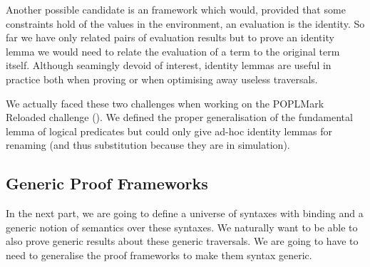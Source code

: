 Another possible candidate is an  framework which would, provided that some
constraints hold of the values in the environment, an evaluation is the identity. So far
we have only related pairs of evaluation results but to prove an identity lemma we would
need to relate the evaluation of a term to the original term itself. Although seamingly
devoid of interest, identity lemmas are useful in practice both when proving or when optimising
away useless traversals.

We actually faced these two challenges when working on the POPLMark Reloaded challenge
(\cite{poplmark2}). We defined the proper generalisation of the fundamental lemma of
logical predicates but could only give ad-hoc identity lemmas for renaming (and thus
substitution because they are in simulation).

\subsection{Generic Proof Frameworks}

In the next part, we are going to define a universe of syntaxes with binding and a generic
notion of semantics over these syntaxes. We naturally want to be able to also prove generic
results about these generic traversals. We are going to have to need to generalise the proof
frameworks to make them syntax generic.
